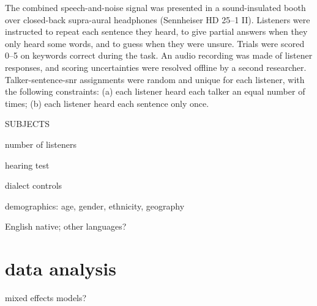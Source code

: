 The combined speech-and-noise signal was presented in a sound-insulated booth over closed-back supra-aural headphones (Sennheiser HD 25–1 II).  Listeners were instructed to repeat each sentence they heard, to give partial answers when they only heard some words, and to guess when they were unsure.  Trials were scored 0–5 on keywords correct during the task.  An audio recording was made of listener responses, and scoring uncertainties were resolved offline by a second researcher.  Talker-sentence-\ac{snr} assignments were random and unique for each listener, with the following constraints: (a) each listener heard each talker an equal number of times; (b) each listener heard each sentence only once.

SUBJECTS
\begin{itm}
	\item{number of listeners}
	\item{hearing test}
	\item{dialect controls}
	\item{demographics: age, gender, ethnicity, geography}
	\item{English native; other languages?}
\end{itm}

\section{data analysis}
\begin{itm}
	\item{mixed effects models?}
\end{itm}
